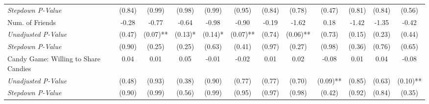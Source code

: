 \begin{tabular}{l c c c c c c c c c c c}
\quad \textit{Stepdown P-Value} & (0.84) & (0.99) & (0.98) & (0.99) & (0.95) & (0.84) & (0.78) & (0.47) & (0.81) & (0.84) & (0.56) \\
Num. of Friends & -0.28 & -0.77 & -0.64 & -0.98 & -0.90 & -0.19 & -1.62 & 0.18 & -1.42 & -1.35 & -0.42 \\
\quad \textit{Unadjusted P-Value} & (0.47) & (0.07)** & (0.13)* & (0.14)* & (0.07)** & (0.74) & (0.06)** & (0.73) & (0.15) & (0.23) & (0.44) \\
\quad \textit{Stepdown P-Value} & (0.90) & (0.25) & (0.25) & (0.63) & (0.41) & (0.97) & (0.27) & (0.98) & (0.36) & (0.76) & (0.65) \\
Candy Game: Willing to Share Candies & 0.04 & 0.01 & 0.05 & -0.01 & -0.02 & 0.01 & 0.02 & -0.08 & 0.01 & 0.04 & -0.08 \\
\quad \textit{Unadjusted P-Value} & (0.48) & (0.93) & (0.38) & (0.90) & (0.77) & (0.77) & (0.70) & (0.09)** & (0.85) & (0.63) & (0.10)** \\
\quad \textit{Stepdown P-Value} & (0.90) & (0.99) & (0.56) & (0.99) & (0.95) & (0.97) & (0.98) & (0.42) & (0.92) & (0.84) & (0.35) \\
\bottomrule
\end{tabular}
